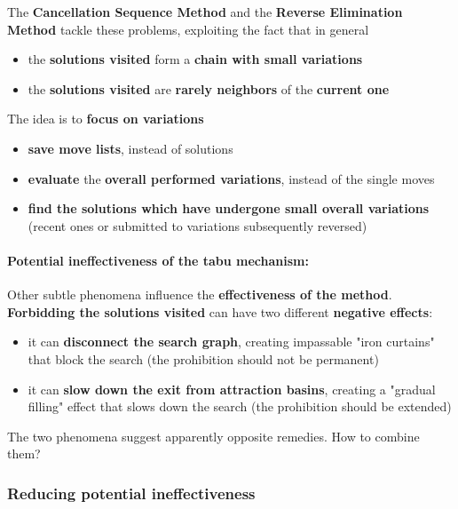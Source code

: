The \textbf{Cancellation Sequence Method} and the \textbf{Reverse Elimination Method} tackle these problems, exploiting the fact that in general
\begin{itemize}
	\item the \textbf{solutions visited} form a \textbf{chain with small variations}
	\item the \textbf{solutions visited} are \textbf{rarely neighbors} of the \textbf{current one}
\end{itemize}

The idea is to \textbf{focus on variations}
\begin{itemize}
	\item \textbf{save move lists}, instead of solutions
	\item \textbf{evaluate} the \textbf{overall performed variations}, instead of the single moves
	\item \textbf{find the solutions which have undergone small overall variations} (recent ones or submitted to variations subsequently reversed)
\end{itemize}

\vfill

\paragraph{Potential ineffectiveness of the tabu mechanism:} Other subtle phenomena influence the \textbf{effectiveness of the method}.\\

\textbf{Forbidding the solutions visited} can have two different \textbf{negative effects}:
\begin{itemize}
	\item it can \textbf{disconnect the search graph}, creating impassable "iron curtains" that block the search (the prohibition should not be permanent)
	
	\item it can \textbf{slow down the exit from attraction basins}, creating a "gradual filling" effect that slows down the search (the prohibition should be extended)
\end{itemize}

The two phenomena suggest apparently opposite remedies. How to combine them? \\

\newpage

\subsubsection{Reducing potential ineffectiveness}

